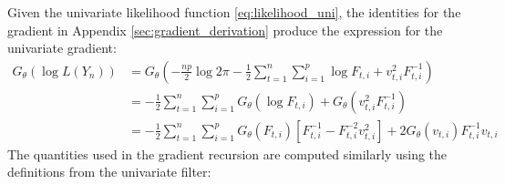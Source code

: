 \documentclass[12pt]{article}
\newcommand{\Gt}{G_\theta}
\begin{document}

	Given the univariate likelihood function \eqref{eq:likelihood_uni}, the identities for the gradient in Appendix \ref{sec:gradient_derivation} produce the expression for the univariate gradient: 
	\begin{align*}
	\Gt(\log L(Y_n)) &= \Gt \left(-\frac{np}{2} \log 2\pi - \frac{1}{2} \sum_{t=1}^n \sum_{i=1}^p \log F_{t,i}+ v_{t,i}^2 F_{t,i}^{-1}\right) \\
	&= -\frac{1}{2} \sum_{t=1}^n \sum_{i=1}^p \Gt(\log F_{t,i}) + \Gt(v_{t,i}^2 F_{t,i}^{-1}) \\
	&= -\frac{1}{2} \sum_{t=1}^n \sum_{i=1}^p \Gt(F_{t,i}) \left[F_{t,i}^{-1} - F_{t,i}^{-2} v_{t,i}^2\right] + 2 \Gt(v_{t,i}) F_{t,i}^{-1} v_{t,i}
	\end{align*}
	The quantities used in the gradient recursion are computed similarly using the definitions from the univariate filter: 
\end{document}
